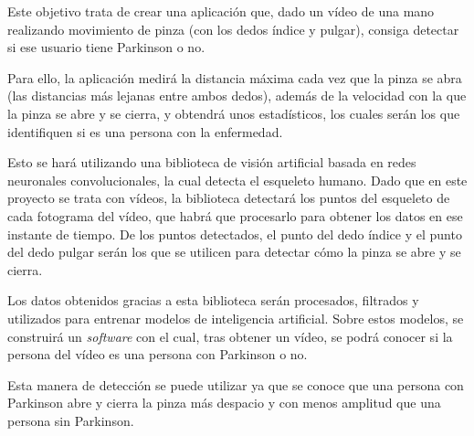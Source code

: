 Este objetivo trata de crear una aplicación que, dado un vídeo de una mano realizando movimiento de pinza (con los dedos índice y pulgar), consiga detectar si ese usuario tiene Parkinson o no.

Para ello, la aplicación medirá la distancia máxima cada vez que la pinza se abra (las distancias más lejanas entre ambos dedos), además de la velocidad con la que la pinza se abre y se cierra, y obtendrá unos estadísticos, los cuales serán los que identifiquen si es una persona con la enfermedad.

Esto se hará utilizando una biblioteca de visión artificial basada en redes neuronales convolucionales, la cual detecta el esqueleto humano. Dado que en este proyecto se trata con vídeos, la biblioteca detectará los puntos del esqueleto de cada fotograma del vídeo, que habrá que procesarlo para
obtener los datos en ese instante de tiempo. De los puntos detectados, el punto del dedo índice y el punto del dedo pulgar serán los que se utilicen para detectar cómo la pinza se abre y se cierra.

Los datos obtenidos gracias a esta biblioteca serán procesados, filtrados y utilizados para entrenar modelos de inteligencia artificial. Sobre estos modelos, se construirá un \textit{software} con el cual, tras obtener un vídeo, se podrá conocer si la persona del vídeo es una persona con Parkinson o no.

Esta manera de detección se puede utilizar ya que se conoce que una persona con Parkinson abre y cierra la pinza más despacio y con menos amplitud que una persona sin Parkinson.
